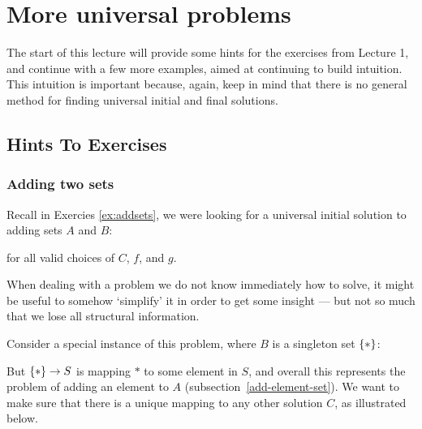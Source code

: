 \chapter{More universal problems}

The start of this lecture will provide some hints for the exercises from Lecture
1, and continue with a few more examples, aimed at continuing to build intuition.
This intuition is important because, again, keep in mind that there is no
general method for finding universal initial and final solutions.

\section{Hints To Exercises}

\subsection{Adding two sets}

Recall in Exercies \ref{ex:addsets}, we were looking for a universal initial
solution to adding sets $A$ and $B$:
\begin{center}
\end{center}
for all valid choices of $C$, $f$, and $g$.

When dealing with a problem we do not know immediately how to solve, it might be
useful to somehow `simplify' it in order to get some insight --- but not so much
that we lose all structural information.

Consider a special instance of this problem, where $B$ is a singleton set
$\{ \ast \}$:

\begin{center}
\end{center}

But $\{ \ast \} \to S$ is mapping $\ast$ to some element in $S$, and overall
this represents the problem of adding an element to $A$
(subsection~\ref{add-element-set}). We want to make sure that there is a unique
mapping to any other solution $C$, as illustrated below.


